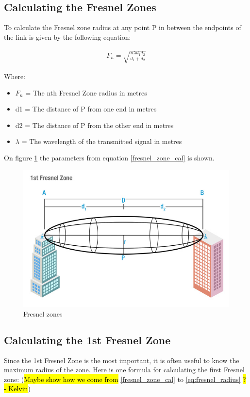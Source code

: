\subsection{Calculating the Fresnel Zones}
To calculate the Fresnel zone radius at any point P in between the endpoints of the link is given by the following equation: 

\begin{align}
F_n = \sqrt{\frac{n \lambda d_1 d_2}{d_1+d_2}} \label{fresnel_zone_cal}
\end{align}

Where:
\begin{itemize}[label=]
\item $F_n$ = The nth Fresnel Zone radius in metres
\item d1 = The distance of P from one end in metres
\item d2 = The distance of P from the other end in metres
\item $\lambda$ = The wavelength of the transmitted signal in metres
\end{itemize}

\noindent On figure \ref{fig:fresnel_zones} the parameters from equation \ref{fresnel_zone_cal} is shown. 
\begin{figure}[H]
	\centering
	\includegraphics[scale=0.70]{figures/fresnel_zone.jpg}
	\caption{Fresnel zones}
	\label{fig:fresnel_zones}
\end{figure}  

\subsection{Calculating the 1st Fresnel Zone}
Since the 1st Fresnel Zone is the most important, it is often useful to know the maximum radius of the zone. Here is one formula for calculating the first Fresnel zone: (\hl{Maybe show how we come from} \ref{fresnel_zone_cal} to \ref{eq:fresnel_radius} \hl{? - Kelvin})

